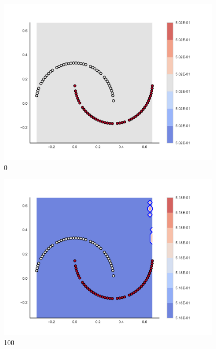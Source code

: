 
\begin{subfigure}[b]{0.09\textwidth}
    \includegraphics[clip, trim=2.35cm 1.75cm 4.5cm 0cm,width=\textwidth]{img/convergence/0.pdf}
    \caption{0}
    \label{fig:convergence_0}
\end{subfigure}
%
\begin{subfigure}[b]{0.09\textwidth}
    \includegraphics[clip, trim=2.35cm 1.75cm 4.5cm 0cm,width=\textwidth]{img/convergence/100.pdf}
    \caption{100}
    \label{fig:convergence_100}
\end{subfigure}
%

